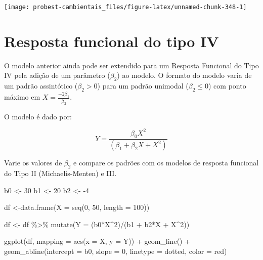\documentclass[
]{book}
\newenvironment{Shaded}{\begin{snugshade}}{\end{snugshade}}
\newcommand{\AttributeTok}[1]{\textcolor[rgb]{0.77,0.63,0.00}{#1}}
\newcommand{\DecValTok}[1]{\textcolor[rgb]{0.00,0.00,0.81}{#1}}
\newcommand{\FunctionTok}[1]{\textcolor[rgb]{0.00,0.00,0.00}{#1}}
\newcommand{\NormalTok}[1]{#1}
\newcommand{\OtherTok}[1]{\textcolor[rgb]{0.56,0.35,0.01}{#1}}
\newcommand{\SpecialCharTok}[1]{\textcolor[rgb]{0.00,0.00,0.00}{#1}}
\newcommand{\StringTok}[1]{\textcolor[rgb]{0.31,0.60,0.02}{#1}}
\begin{document}
\begin{center}\texttt{[image: probest-cambientais\_files/figure-latex/unnamed-chunk-348-1]} \end{center}

\hypertarget{resposta-funcional-do-tipo-iv}{%
\section{Resposta funcional do tipo IV}\label{resposta-funcional-do-tipo-iv}}

O modelo anterior ainda pode ser extendido para um Resposta Funcional do Tipo IV pela adição de um parâmetro (\(\beta_2\)) ao modelo. O formato do modelo varia de um padrão assintótico (\(\beta_2 > 0\)) para um padrão unimodal (\(\beta_2 \le 0\)) com ponto máximo em \(X = \frac{-2\beta_1}{\beta_2}\).

O modelo é dado por:

\[Y = \frac{\beta_0 X^2}{(\beta_1 + \beta_2 X + X^2)}\]

Varie os valores de \(\beta_2\) e compare os padrões com os modelos de resposta funcional do Tipo II (Michaelis-Menten) e III.

\begin{Shaded}
\begin{Highlighting}[]
\NormalTok{b0 }\OtherTok{\textless{}{-}} \DecValTok{30}
\NormalTok{b1 }\OtherTok{\textless{}{-}} \DecValTok{20}
\NormalTok{b2 }\OtherTok{\textless{}{-}} \SpecialCharTok{{-}}\DecValTok{4}

\NormalTok{df }\OtherTok{\textless{}{-}}\FunctionTok{data.frame}\NormalTok{(}\AttributeTok{X =} \FunctionTok{seq}\NormalTok{(}\DecValTok{0}\NormalTok{, }\DecValTok{50}\NormalTok{, }\AttributeTok{length =} \DecValTok{100}\NormalTok{))}

\NormalTok{df }\OtherTok{\textless{}{-}}\NormalTok{ df }\SpecialCharTok{\%\textgreater{}\%} \FunctionTok{mutate}\NormalTok{(}\AttributeTok{Y =}\NormalTok{ (b0}\SpecialCharTok{*}\NormalTok{X}\SpecialCharTok{\^{}}\DecValTok{2}\NormalTok{)}\SpecialCharTok{/}\NormalTok{(b1 }\SpecialCharTok{+}\NormalTok{ b2}\SpecialCharTok{*}\NormalTok{X }\SpecialCharTok{+}\NormalTok{ X}\SpecialCharTok{\^{}}\DecValTok{2}\NormalTok{))}

\FunctionTok{ggplot}\NormalTok{(df, }\AttributeTok{mapping =} \FunctionTok{aes}\NormalTok{(}\AttributeTok{x =}\NormalTok{ X, }\AttributeTok{y =}\NormalTok{ Y)) }\SpecialCharTok{+}
  \FunctionTok{geom\_line}\NormalTok{() }\SpecialCharTok{+}
  \FunctionTok{geom\_abline}\NormalTok{(}\AttributeTok{intercept =}\NormalTok{ b0, }\AttributeTok{slope =} \DecValTok{0}\NormalTok{, }\AttributeTok{linetype =} \StringTok{\textquotesingle{}dotted\textquotesingle{}}\NormalTok{, }\AttributeTok{color =} \StringTok{\textquotesingle{}red\textquotesingle{}}\NormalTok{)}
\end{Highlighting}
\end{Shaded}
\end{document}
